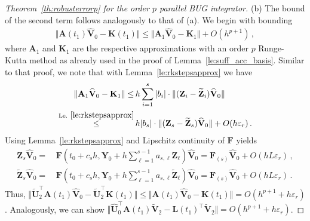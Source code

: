 \documentclass[preprint,runningheads]{svjour3}
\def\wh{\widehat}
\newcommand\bfA{{\mathbf A}}
\newcommand\bfF{{\mathbf F}}
\newcommand\bfK{{\mathbf K}}
\newcommand\bfL{{\mathbf L}}
\newcommand\bfU{{\mathbf U}}
\newcommand\bfV{{\mathbf V}}
\newcommand\bfY{{\mathbf Y}}
\newcommand\bfZ{{\mathbf Z}}
\begin{document}
\begin{proof}[Theorem~\ref{th:robusterrorp} for the order $p$ parallel BUG integrator]
(b) The bound of the second term follows analogously to that of (a). We begin with bounding
\begin{align*}
    \Vert \bfA(t_1)\wh\bfV_0 - \bfK(t_1) \Vert \leq \Vert \bfA_1\wh\bfV_0 - \bfK_1 \Vert + O(h^{p+1})\,,
\end{align*}
where $\bfA_1$ and $\bfK_1$ are the respective approximations with an order $p$ Runge-Kutta method as already used in the proof of Lemma~\ref{le:suff_acc_basis}. Similar to that proof, we note that with Lemma~\ref{le:rkstepsapprox} we have
\begin{align*}
    \Vert \bfA_1\wh\bfV_0 - \bfK_1 \Vert \leq\,& h\sum_{i=1}^s |b_i| \cdot \Vert (\bfZ_i - \widetilde \bfZ_i)\wh\bfV_0 \Vert \\
    \stackrel{\mathrm{Le.~\ref{le:rkstepsapprox}}}{\leq}\,& h |b_s| \cdot \Vert (\bfZ_s - \widetilde \bfZ_s)\wh\bfV_0 \Vert +O(h\varepsilon_r)\,.
\end{align*}
Using Lemma~\ref{le:rkstepsapprox} and Lipschitz continuity of $\bfF$ yields
\begin{align*}
    \bfZ_s\wh \bfV_0 =\,& \bfF(t_0 + c_s h, \bfY_0 + h\sum_{\ell = 1}^{s-1}a_{s,\ell} \bfZ_{\ell})\wh \bfV_0 = \bfF_{(s)}\wh \bfV_0 + O(hL\varepsilon_r)\,,\\
    \widetilde \bfZ_s\wh \bfV_0 =\,& \bfF(t_0 + c_s h, \bfY_0 + h\sum_{\ell = 1}^{s-1}a_{s,\ell} \widetilde \bfZ_{\ell})\wh \bfV_0 = \bfF_{(s)}\wh \bfV_0 + O(hL\varepsilon_r)\,.
\end{align*}
Thus, $\Vert \widetilde{\bfU}_2^{\top}\bfA(t_1)\wh\bfV_0 - \widetilde{\bfU}_2^{\top}\bfK(t_1) \Vert \leq \Vert\bfA(t_1)\wh\bfV_0 - \bfK(t_1) \Vert = O(h^{p+1} + h\varepsilon_r)$. Analogously, we can show $\Vert \wh\bfU_0^{\top}\bfA(t_1)\widetilde{\bfV}_2 - \bfL(t_1)^{\top}\widetilde{\bfV}_2 \Vert= O(h^{p+1} + h\varepsilon_r)$.


\end{proof}
\end{document}

